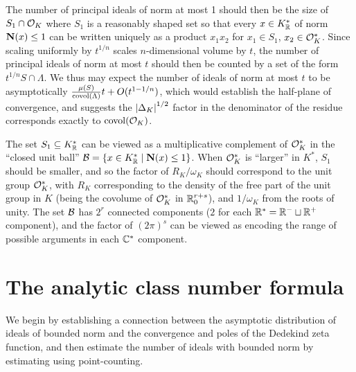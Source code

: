 \documentclass[11pt]{report}
\begin{document}
The number of principal ideals of norm at most 1 should then be the size of $S_1 \cap \mathcal{O}_K$ where $S_1$ is a reasonably shaped set so that every $x \in K_{\mathbb{R}}^*$ of norm $\operatorname{\mathbf{N}}(x) \leq 1$ can be written uniquely as a product $x_1x_2$ for $x_1 \in S_1$, $x_2 \in \mathcal{O}_K^*$. Since scaling uniformly by $t^{1/n}$ scales $n$-dimensional volume by $t$, the number of principal ideals of norm at most $t$ should then be counted by a set of the form $t^{1/n} S \cap \Lambda$. We thus may expect the number of ideals of norm at most $t$ to be asymptotically $\frac{\mu(S)}{\operatorname{covol}(\Lambda)}t + O(t^{1 - 1/n})$, which would establish the half-plane of convergence, and suggests the $\left| \Delta_K \right|^{1/2}$ factor in the denominator of the residue corresponds exactly to $\operatorname{covol}(\mathcal{O}_K)$.

The set $S_1 \subseteq K_{\mathbb{R}}^*$ can be viewed as a multiplicative complement of $\mathcal{O}_K^*$ in the ``closed unit ball'' ${\mathcal{B} = \left\{  x \in K_{\mathbb{R}}^* \mid \operatorname{\mathbf{N}}(x) \leq 1  \right\}}$. When $\mathcal{O}_K^*$ is ``larger'' in $K^*$, $S_1$ should be smaller, and so the factor of $R_K/\omega_K$ should correspond to the unit group $\mathcal{O}_K^*$, with $R_K$ corresponding to the density of the free part of the unit group in $K$ (being the covolume of $\mathcal{O}_K^*$ in $\mathbb{R}_{0}^{r + s}$), and $1/\omega_K$ from the roots of unity. The set $\mathcal{B}$ has $2^r$ connected components ($2$ for each $\mathbb{R}^*  = \mathbb{R}^- \sqcup \mathbb{R}^+$ component), and the factor of $(2\pi)^s$ can be viewed as encoding the range of possible arguments in each $\mathbb{C}^*$ component.




\chapter{The analytic class number formula}
We begin by establishing a connection between the asymptotic distribution of ideals of bounded norm and the convergence and poles of the Dedekind zeta function, and then estimate the number of ideals with bounded norm by estimating using point-counting.
\end{document}
